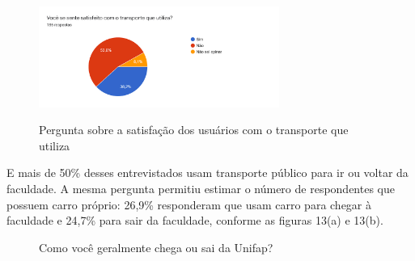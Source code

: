 \begin{figure}[!hbtp]
	\centering
	\caption{Pergunta sobre a satisfação dos usuários com o transporte que utiliza}
	\includegraphics[width=0.7\textwidth]{./04-figuras/questionario/6.png}
	\label{fig:satisfacao}
\end{figure}

E mais de 50\% desses entrevistados usam transporte público para ir ou voltar da faculdade. A mesma pergunta permitiu estimar o número de respondentes que possuem carro próprio: 26,9\% responderam que usam carro para chegar à faculdade e 24,7\% para sair da faculdade, conforme as figuras 13(a) e 13(b).

\begin{figure}[h]
	
	\center
	\qquad
	\caption{Como você geralmente chega ou sai da Unifap?}
	
\end{figure}


